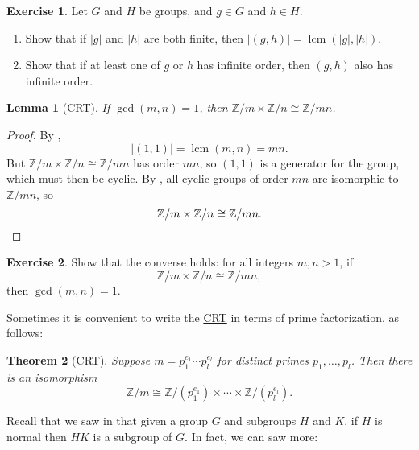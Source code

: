 \documentclass[12pt]{report}
\newtheorem{theorem}{Theorem}[chapter]
\newtheorem{lemma}[theorem]{Lemma}
\numberwithin{equation}{section}
\numberwithin{theorem}{chapter}
\theoremstyle{definition}
\newtheorem{exercise}{Exercise}
\newtheorem*{basic properties}{Basic Properties}
\newtheorem*{Important Remark}{Important Remark}
\DeclareMathOperator{\lcm}{lcm}
\begin{document}
\begin{exercise}\label{order of pairs}
	Let $G$ and $H$ be groups, and $g \in G$ and $h \in H$.

\vspace{-0.3em}
\begin{enumerate}[label=(\alph*), itemsep=0.2em]

\item Show that if $|g|$ and $|h|$ are both finite, then $|(g,h)| = \lcm(|g|,|h|)$.

\item Show that if at least one of $g$ or $h$ has infinite order, then $(g,h)$ also has infinite order.

\end{enumerate}
\end{exercise}


\begin{lemma}[CRT]\label{CRT}
If $\gcd(m,n)=1$, then $\mathbb{Z}/m \times \mathbb{Z}/n\cong \mathbb{Z}/mn$. 
\end{lemma}


\begin{proof}
By ,
$$|(1,1)|=\lcm(m,n)=mn.$$ 
But $\mathbb{Z}/m\times \mathbb{Z}/n\cong \mathbb{Z}/mn$ has order $mn$, so $(1,1)$ is a generator for the group, which must then be cyclic. By , all cyclic groups of order $mn$ are isomorphic to $\mathbb{Z}/mn$, so
$$\mathbb{Z}/m\times \mathbb{Z}/n\cong \mathbb{Z}/mn.\qedhere$$
\end{proof}


\begin{exercise}\label{exercise CRT converse}
	Show that the converse holds: for all integers $m, n > 1$, if
	$$\mathbb{Z}/m\times \mathbb{Z}/n\cong \mathbb{Z}/mn,$$ 
	then $\gcd(m,n) = 1$.
\end{exercise}



Sometimes it is convenient to write the \hyperref[CRT]{CRT} in terms of prime factorization, as follows:

\begin{theorem}[CRT]\label{CRT}
Suppose $m = p_1^{e_1} \cdots p_l^{e_l}$ for distinct primes $p_1, \dots, p_l$. Then there is an isomorphism
$$\mathbb{Z}/m \cong \mathbb{Z}/(p_1^{e_1}) \times \cdots \times \mathbb{Z}/(p_l^{e_l}).$$
\end{theorem}


Recall that we saw in  that given a group $G$ and subgroups $H$ and $K$, if $H$ is normal then $HK$ is a subgroup of $G$. In fact, we can saw more:
\end{document}
